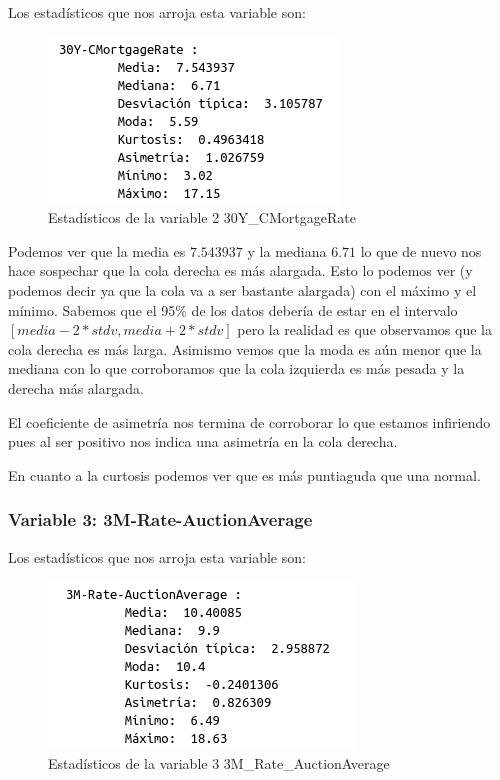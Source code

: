 \documentclass[12pt,a4paper]{article}
\begin{document}
Los estadísticos que nos arroja esta variable son:

\begin{figure}[H]
	\centering
	\includegraphics[scale=0.7]{./Imagenes/EDA/Regresion/estadisticos_30Y_CMortgageRate.png}
	\caption{Estadísticos de la variable 2 30Y\_CMortgageRate}
\end{figure}

Podemos ver que la media es $7.543937$ y la mediana $6.71$ lo que de nuevo nos hace sospechar que la cola derecha es más alargada. Esto lo podemos ver (y podemos decir ya que la cola va a ser bastante alargada) con el máximo y el mínimo. Sabemos que el 95\% de los datos debería de estar en el intervalo $[ media-2*stdv, media+2*stdv ]$ pero la realidad es que observamos que la cola derecha es más larga. Asimismo vemos que la moda es aún menor que la mediana con lo que corroboramos que la cola izquierda es más pesada y la derecha más alargada.

El coeficiente de asimetría nos termina de corroborar lo que estamos infiriendo pues al ser positivo nos indica una asimetría en la cola derecha.

En cuanto a la curtosis podemos ver que es más puntiaguda que una normal.

\subsubsection*{Variable 3: 3M-Rate-AuctionAverage}

Los estadísticos que nos arroja esta variable son:

\begin{figure}[H]
	\centering
	\includegraphics[scale=0.7]{./Imagenes/EDA/Regresion/estadisticos_3M_Rate_AuctionAverage.png}
	\caption{Estadísticos de la variable 3 3M\_Rate\_AuctionAverage}
\end{figure}
\end{document}
